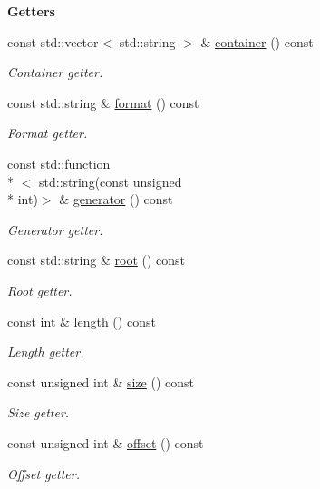 \begin{Indent}{\bf Getters}\par
\begin{DoxyCompactItemize}
\item 
const std\-::vector$<$ std\-::string $>$ \& \hyperlink{exceptionmagrathea_1_1FileList_a1df56f9bc877fd3ad69633de8429ac3b}{container} () const 
\begin{DoxyCompactList}\small\item\em Container getter. \end{DoxyCompactList}\item 
const std\-::string \& \hyperlink{exceptionmagrathea_1_1FileList_aaf94353623e478ac6fcddab7c7ab39ae}{format} () const 
\begin{DoxyCompactList}\small\item\em Format getter. \end{DoxyCompactList}\item 
const std\-::function\\*
$<$ std\-::string(const unsigned \\*
int)$>$ \& \hyperlink{exceptionmagrathea_1_1FileList_aa2808f957f41c703a6244a189d675359}{generator} () const 
\begin{DoxyCompactList}\small\item\em Generator getter. \end{DoxyCompactList}\item 
const std\-::string \& \hyperlink{exceptionmagrathea_1_1FileList_a185c0749fed177bfabefb1f64be97a77}{root} () const 
\begin{DoxyCompactList}\small\item\em Root getter. \end{DoxyCompactList}\item 
const int \& \hyperlink{exceptionmagrathea_1_1FileList_a2941419afd68830b3913da11d92c5a8a}{length} () const 
\begin{DoxyCompactList}\small\item\em Length getter. \end{DoxyCompactList}\item 
const unsigned int \& \hyperlink{exceptionmagrathea_1_1FileList_a010996bd1083955ffaa3824a586d8a9e}{size} () const 
\begin{DoxyCompactList}\small\item\em Size getter. \end{DoxyCompactList}\item 
const unsigned int \& \hyperlink{exceptionmagrathea_1_1FileList_a28342ebcbdc8e3bf04ef9fc97544edf4}{offset} () const 
\begin{DoxyCompactList}\small\item\em Offset getter. \end{DoxyCompactList}\end{DoxyCompactItemize}
\end{Indent}
